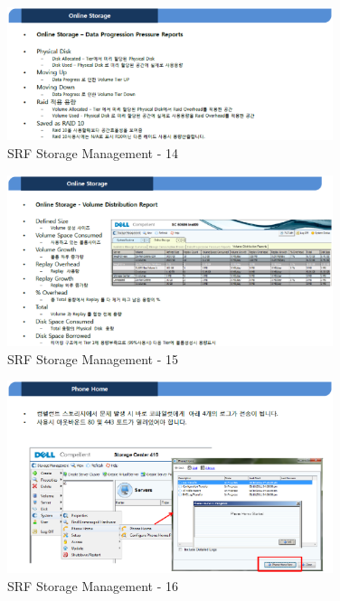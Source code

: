 \documentclass[11pt
  , a4paper
  , article
  , oneside
]{memoir}
\begin{document}
\begin{figure}[h!]
	\centering
	\includegraphics[width=0.85\textwidth]{./images/srfdb_storage_mana_14.eps}
	\caption{SRF Storage Management - 14}
	\label{fig:srfdb_mana_14} 
\end{figure}

\begin{figure}[h!]
	\centering
	\includegraphics[width=0.85\textwidth]{./images/srfdb_storage_mana_15.eps}
	\caption{SRF Storage Management - 15}
	\label{fig:srfdb_mana_15} 
\end{figure}

\begin{figure}[h!]
	\centering
	\includegraphics[width=0.85\textwidth]{./images/srfdb_storage_mana_16.eps}
	\caption{SRF Storage Management - 16}
	\label{fig:srfdb_mana_16} 
\end{figure}
\end{document}
